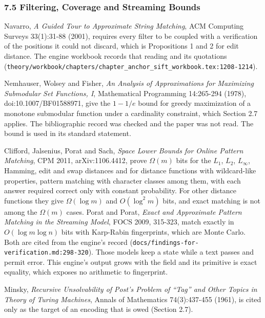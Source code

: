 \subsubsection{7.5 Filtering, Coverage and Streaming Bounds}

Navarro, \emph{A Guided Tour to Approximate String Matching}, ACM Computing Surveys 33(1):31-88 (2001), requires every filter to be coupled with a verification of the positions it could not discard, which is Propositions 1 and 2 for edit distance. The engine workbook records that reading and its quotations (\texttt{theory/\allowbreak{}workbook/\allowbreak{}chapters/\allowbreak{}chapter\_anchor\_sift\_workbook.tex:1208-\allowbreak{}1214}).

Nemhauser, Wolsey and Fisher, \emph{An Analysis of Approximations for Maximizing Submodular Set Functions, I}, Mathematical Programming 14:265-294 (1978), doi:10.1007/BF01588971, give the \(1 - 1/e\) bound for greedy maximization of a monotone submodular function under a cardinality constraint, which Section 2.7 applies. The bibliographic record was checked and the paper was not read. The bound is used in its standard statement.

Clifford, Jalsenius, Porat and Sach, \emph{Space Lower Bounds for Online Pattern Matching}, CPM 2011, arXiv:1106.4412, prove \(\Omega(m)\) bits for the \(L_1\), \(L_2\), \(L_\infty\), Hamming, edit and swap distances and for distance functions with wildcard-like properties, pattern matching with character classes among them, with each answer required correct only with constant probability. For other distance functions they give \(\Omega(\log m)\) and \(O(\log^2 m)\) bits, and exact matching is not among the \(\Omega(m)\) cases. Porat and Porat, \emph{Exact and Approximate Pattern Matching in the Streaming Model}, FOCS 2009, 315-323, match exactly in \(O(\log m \log n)\) bits with Karp-Rabin fingerprints, which are Monte Carlo. Both are cited from the engine's record (\texttt{docs/\allowbreak{}findings-\allowbreak{}for-\allowbreak{}verification.md:298-\allowbreak{}320}). Those models keep a state while a text passes and permit error. This engine's output grows with the field and its primitive is exact equality, which exposes no arithmetic to fingerprint.

Minsky, \emph{Recursive Unsolvability of Post's Problem of ``Tag'' and Other Topics in Theory of Turing Machines}, Annals of Mathematics 74(3):437-455 (1961), is cited only as the target of an encoding that is owed (Section 2.7).

